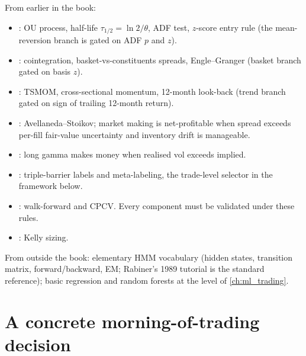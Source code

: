 \begin{backgroundbox}[Prerequisites]
From earlier in the book:
\begin{itemize}
  \item {}: OU process, half-life
  $\tau_{1/2} = \ln 2 / \theta$, ADF test, $z$-score entry rule
  (the mean-reversion branch is gated on ADF $p$ and $z$).
  \item {}:
  cointegration, basket-vs-constituents spreads, Engle--Granger
  (basket branch gated on basis $z$).
  \item {}: TSMOM, cross-sectional momentum,
  12-month look-back (trend branch gated on sign of trailing
  12-month return).
  \item {}: Avellaneda--Stoikov; market
  making is net-profitable when spread exceeds per-fill
  fair-value uncertainty and inventory drift is manageable.
  \item {}: long gamma
  makes money when realised vol exceeds implied.
  \item {}: triple-barrier labels and
  meta-labeling, the trade-level selector in the framework
  below.
  \item {}: walk-forward and CPCV. Every
  component must be validated under these rules.
  \item {}: Kelly sizing.
\end{itemize}
From outside the book: elementary HMM vocabulary (hidden states,
transition matrix, forward/backward, EM; Rabiner's 1989 tutorial
is the standard reference); basic regression and random forests at
the level of \cref{ch:ml_trading}.
\end{backgroundbox}

\section{A concrete morning-of-trading decision}
\label{sec:wsw_toy_example}

